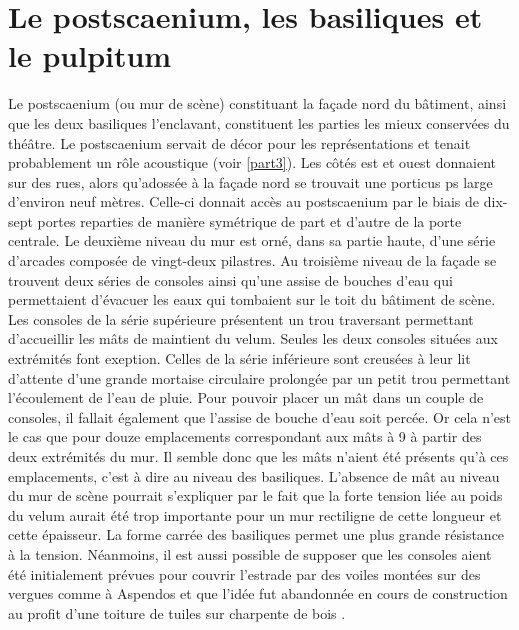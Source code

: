 \section{Le \gls{postscaenium}, les \glspl{basilique} et le \gls{pulpitum}}
\label{sect_postscaenium}
		
		Le \gls{postscaenium} (ou mur de scène) constituant la façade nord du bâtiment, ainsi que les deux \glspl{basilique} l'enclavant, constituent les parties les mieux conservées du théâtre. Le \gls{postscaenium} servait de décor pour les représentations et tenait probablement un rôle acoustique (voir \autoref{part3}). Les côtés est et ouest donnaient sur des rues, alors qu'adossée à la façade nord se trouvait une \gls{porticus ps} large d'environ neuf mètres. Celle-ci donnait accès au \gls{postscaenium} par le biais de dix-sept portes reparties de manière symétrique de part et d'autre de la porte centrale. Le deuxième niveau du mur est orné, dans sa partie haute, d'une série d'arcades composée de vingt-deux \glspl{pilastre}. Au troisième niveau de la façade se trouvent deux séries de \glspl{console} ainsi qu'une assise de bouches d'eau qui permettaient d'évacuer les eaux qui tombaient sur le toit du bâtiment de scène. Les \glspl{console} de la série supérieure présentent un trou traversant permettant d'accueillir les mâts de maintient du \gls{velum}. Seules les deux \glspl{console} situées aux extrémités font exeption. Celles de la série inférieure sont creusées à leur lit d'attente d'une grande mortaise circulaire prolongée par un petit trou permettant l'écoulement de l'eau de pluie. Pour pouvoir placer un mât dans un couple de \glspl{console}, il fallait également que l'assise de bouche d'eau soit percée. Or cela n'est le cas que pour douze emplacements correspondant aux mâts  à 9 à partir des deux extrémités du mur. Il semble donc que les mâts n'aient été présents qu'à ces emplacements, c'est à dire au niveau des \glspl{basilique}. L'absence de mât au niveau du mur de scène pourrait s'expliquer par le fait que la forte tension liée au poids du \gls{velum} aurait été trop importante pour un mur rectiligne de cette longueur et cette épaisseur. La forme carrée des basiliques permet une plus grande résistance à la tension. Néanmoins, il est aussi possible de supposer que les \glspl{console} aient été initialement prévues pour couvrir l'estrade par des voiles montées sur des vergues comme à Aspendos et que l'idée fut abandonnée en cours de construction au profit d'une toiture de tuiles sur charpente de bois \cite[p. 144-147]{moretti}. 
		
